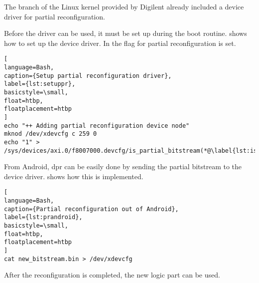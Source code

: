 The branch of the Linux kernel provided by Digilent \cite{DigilentLinux} already included a device driver for partial reconfiguration.

Before the driver can be used, it must be set up during the boot routine.  shows how to set up the device driver. In  the flag for partial reconfiguration is set.

\begin{lstlisting}[
language=Bash,
caption={Setup partial reconfiguration driver},
label={lst:setuppr},
basicstyle=\small,
float=htbp,
floatplacement=htbp
]
echo "++ Adding partial reconfiguration device node"
mknod /dev/xdevcfg c 259 0
echo "1" > /sys/devices/axi.0/f8007000.devcfg/is_partial_bitstream(*@\label{lst:ispart}@*)
\end{lstlisting}

From Android, \gls{dpr} can be easily done by sending the partial bitstream to the device driver.  shows how this is implemented.

\begin{lstlisting}[
language=Bash,
caption={Partial reconfiguration out of Android},
label={lst:prandroid},
basicstyle=\small,
float=htbp,
floatplacement=htbp
]
cat new_bitstream.bin > /dev/xdevcfg
\end{lstlisting}

After the reconfiguration is completed, the new logic part can be used.
